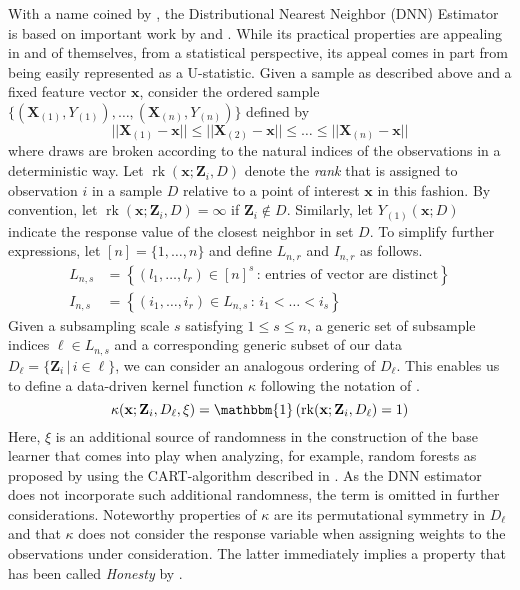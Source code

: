 \documentclass[letterpaper,10pt]{article}
\numberwithin{equation}{section}
\numberwithin{theorem}{section}
\theoremstyle{definition}
\newcommand{\1}{\mathbb{1}}
\begin{document}
With a name coined by \citet{demirkaya_optimal_2024}, the Distributional Nearest Neighbor (DNN) Estimator is based on important work by \citet{steele_exact_2009} and \citet{biau_rate_2010}.
While its practical properties are appealing in and of themselves, from a statistical perspective, its appeal comes in part from being easily represented as a U-statistic.
Given a sample as described above and a fixed feature vector $\mathbf{x}$, consider the ordered sample $\{(\mathbf{X}_{(1)}, Y_{(1)}), \dotsc, (\mathbf{X}_{(n)}, Y_{(n)})\}$ defined by
\begin{equation}\label{ordering}
	||\mathbf{X}_{(1)} - \mathbf{x}|| \leq ||\mathbf{X}_{(2)} - \mathbf{x}|| \leq \dotsc \leq ||\mathbf{X}_{(n)} - \mathbf{x}||
\end{equation}
where draws are broken according to the natural indices of the observations in a deterministic way.
Let $\operatorname{rk}(\mathbf{x}; \mathbf{Z}_i, D)$ denote the \textit{rank} that is assigned to observation $i$ in a sample $D$ relative to a point of interest $\mathbf{x}$ in this fashion.
By convention, let $\operatorname{rk}(\mathbf{x}; \mathbf{Z}_i, D) = \infty$ if $\mathbf{Z}_i \not\in D$.
Similarly, let $Y_{(1)}(\mathbf{x}; D)$ indicate the response value of the closest neighbor in set $D$.
To simplify further expressions, let $[n] = \{1, \dotsc, n\}$ and define $L_{n,r}$ and $I_{n,r}$ as follows.
\begin{align}
	L_{n,s} & = \left\{\left(l_1, \dotsc, l_r\right) \in [n]^{s} \, : \, \text{entries of vector are distinct} \right\} \\
	I_{n,s} & = \left\{\left(i_1, \dotsc, i_r\right) \in L_{n,s} \, : \, i_1 < \dotsc < i_s \right\}
\end{align}
Given a subsampling scale $s$ satisfying $1 \leq s \leq n$, a generic set of subsample indices $\ell \in L_{n,s}$ and a corresponding generic subset of our data $D_{\ell} = \{\mathbf{Z}_i \, | \, i \in \ell\}$, we can consider an analogous ordering of $D_{\ell}$.
This enables us to define a data-driven kernel function $\kappa$ following the notation of \citet{ritzwoller_uniform_2024}.
\begin{equation}
	\kappa(\mathbf{x}; \mathbf{Z}_i, D_{\ell}, \xi)
	= \mathbbm{1}\left(\operatorname{rk}(\mathbf{x}; \mathbf{Z}_i, D_{\ell}) = 1\right)
\end{equation}
Here, $\xi$ is an additional source of randomness in the construction of the base learner that comes into play when analyzing, for example, random forests as proposed by \citet{breiman_random_2001} using the CART-algorithm described in \citet{breiman_classification_2017}.
As the DNN estimator does not incorporate such additional randomness, the term is omitted in further considerations.
Noteworthy properties of $\kappa$ are its permutational symmetry in $D_{\ell}$ and that $\kappa$ does not consider the response variable when assigning weights to the observations under consideration.
The latter immediately implies a property that has been called \textit{Honesty} by \citet{wager_estimation_2018}.
\end{document}
